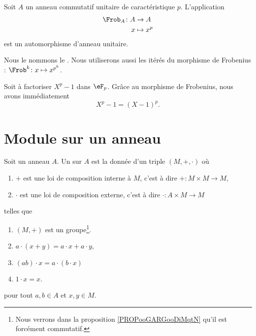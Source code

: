 \begin{proposition} \label{PropFrobHAMkTY}
    Soit \( A\) un anneau commutatif unitaire de caractéristique \( p\). L'application
    \begin{equation}
        \begin{aligned}
            \Frob_A\colon A&\to A \\
            x&\mapsto x^p 
        \end{aligned}
    \end{equation}
    est un automorphisme d'anneau unitaire.
\end{proposition}
Nous le nommons le . Nous utiliserons aussi les itérés du morphisme de Frobenius : \( \Frob^k\colon x\mapsto x^{p^k}\).

\begin{example}
    Soit à factoriser \( X^p-1\) dans \( \eF_p\). Grâce au morphisme de Frobenius, nous avons immédiatement
    \begin{equation}
        X^p-1=(X-1)^p.
    \end{equation}
\end{example}

\section{Module sur un anneau}

\begin{definition}
    Soit un anneau \( A\). Un  sur \( A\) est la donnée d'un triple \( (M,+,\cdot)\) où
    \begin{enumerate}
        \item
            \( +\) est une loi de composition interne à \( M\), c'est à dire \( +\colon M\times M\to M\),
        \item
            \( \cdot\) est une loi de composition externe, c'est à dire \( \cdot\colon A\times M\to M\)
    \end{enumerate}
    telles que 
    \begin{enumerate}
        \item
            \( (M,+)\) est un groupe\footnote{Nous verrons dans la proposition \ref{PROPooGARGooDiMqtN} qu'il est forcément commutatif.}.
        \item
            \( a\cdot(x+y)=a\cdot x+a\cdot y\),
        \item
            \( (ab)\cdot x=a\cdot(b\cdot x)\)
        \item
            \( 1\cdot x=x\).
    \end{enumerate}
    pour tout \( a,b\in A\) et \( x,y\in M\).
\end{definition}

